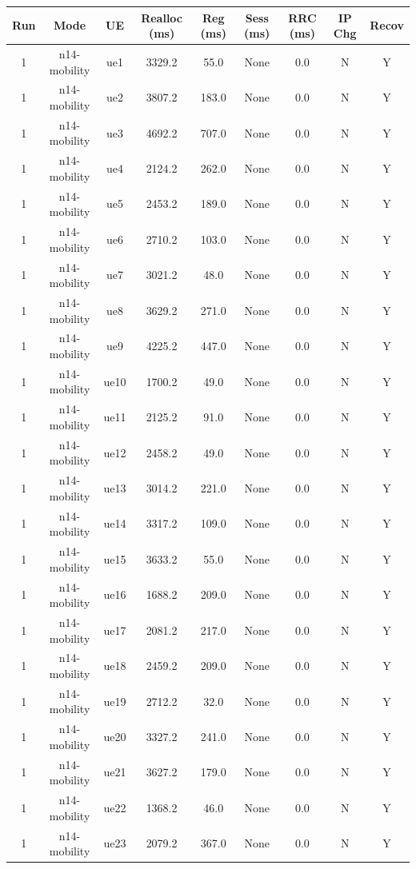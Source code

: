 \begin{table}[ht]
\centering
\begin{tabular}{|c|c|c|c|c|c|c|c|c|}
\hline
Run & Mode & UE & Realloc (ms) & Reg (ms) & Sess (ms) & RRC (ms) & IP Chg & Recov \\
\hline
1 & n14-mobility & ue1 & 3329.2 & 55.0 & None & 0.0 & N & Y \\
1 & n14-mobility & ue2 & 3807.2 & 183.0 & None & 0.0 & N & Y \\
1 & n14-mobility & ue3 & 4692.2 & 707.0 & None & 0.0 & N & Y \\
1 & n14-mobility & ue4 & 2124.2 & 262.0 & None & 0.0 & N & Y \\
1 & n14-mobility & ue5 & 2453.2 & 189.0 & None & 0.0 & N & Y \\
1 & n14-mobility & ue6 & 2710.2 & 103.0 & None & 0.0 & N & Y \\
1 & n14-mobility & ue7 & 3021.2 & 48.0 & None & 0.0 & N & Y \\
1 & n14-mobility & ue8 & 3629.2 & 271.0 & None & 0.0 & N & Y \\
1 & n14-mobility & ue9 & 4225.2 & 447.0 & None & 0.0 & N & Y \\
1 & n14-mobility & ue10 & 1700.2 & 49.0 & None & 0.0 & N & Y \\
1 & n14-mobility & ue11 & 2125.2 & 91.0 & None & 0.0 & N & Y \\
1 & n14-mobility & ue12 & 2458.2 & 49.0 & None & 0.0 & N & Y \\
1 & n14-mobility & ue13 & 3014.2 & 221.0 & None & 0.0 & N & Y \\
1 & n14-mobility & ue14 & 3317.2 & 109.0 & None & 0.0 & N & Y \\
1 & n14-mobility & ue15 & 3633.2 & 55.0 & None & 0.0 & N & Y \\
1 & n14-mobility & ue16 & 1688.2 & 209.0 & None & 0.0 & N & Y \\
1 & n14-mobility & ue17 & 2081.2 & 217.0 & None & 0.0 & N & Y \\
1 & n14-mobility & ue18 & 2459.2 & 209.0 & None & 0.0 & N & Y \\
1 & n14-mobility & ue19 & 2712.2 & 32.0 & None & 0.0 & N & Y \\
1 & n14-mobility & ue20 & 3327.2 & 241.0 & None & 0.0 & N & Y \\
1 & n14-mobility & ue21 & 3627.2 & 179.0 & None & 0.0 & N & Y \\
1 & n14-mobility & ue22 & 1368.2 & 46.0 & None & 0.0 & N & Y \\
1 & n14-mobility & ue23 & 2079.2 & 367.0 & None & 0.0 & N & Y \\

\end{tabular}
\end{table}
